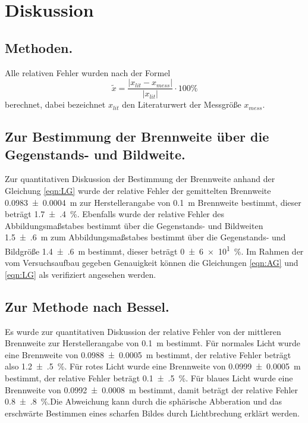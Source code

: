 \section{Diskussion}
\label{sec:Diskussion}
\subsection{Methoden.}
Alle relativen Fehler wurden nach der Formel
\begin{equation*}
  \tilde{x} = \frac{ \lvert x_{lit} - x_{mess} \rvert}{\lvert x_{lit} \rvert}
  \cdot 100 \%
\end{equation*}
berechnet, dabei bezeichnet $x_{lit}$ den Literaturwert der Messgröße $x_{mess}$.

\subsection{Zur Bestimmung der Brennweite über die Gegenstands- und Bildweite.}
Zur quantitativen Diskussion der Bestimmung der Brennweite anhand der Gleichung
\eqref{eqn:LG} wurde der relative Fehler der gemittelten Brennweite
\SI{0.0983(4)}{\meter} zur Herstellerangabe von \SI{0.1}{\meter} Brennweite
bestimmt, dieser beträgt \SI{1.7(4)}{\percent}. Ebenfalls wurde der relative
Fehler des Abbildungsmaßstabes bestimmt über die Gegenstands- und Bildweiten
\SI{1.5(6)}{\meter}
zum Abbildungsmaßstabes bestimmt über die Gegenstands- und Bildgröße
\SI{1.4(6)}{\meter} bestimmt, dieser beträgt \SI{0(6)e1}{\percent}.
Im Rahmen der vom Versuchsaufbau gegeben Genauigkeit können die Gleichungen
\eqref{eqn:AG} und \eqref{eqn:LG} als verifiziert angesehen werden.

\subsection{Zur Methode nach Bessel.}
Es wurde zur quantitativen Diskussion der relative Fehler von
der mittleren Brennweite zur Herstellerangabe von \SI{0.1}{\meter} bestimmt.
Für normales Licht wurde eine Brennweite von \SI{0.0988(5)}{\meter} bestimmt,
der relative Fehler beträgt also \SI{1.2(5)}{\percent}.
Für rotes Licht wurde eine Brennweite von \SI{0.0999(5)}{\meter}
bestimmt, der relative Fehler beträgt \SI{0.1(5)}{\percent}. Für blaues
Licht wurde eine Brennweite von \SI{0.0992(8)}{\meter} bestimmt, damit
beträgt der relative Fehler \SI{0.8(8)}{\percent}.Die Abweichung kann durch die sphärische
Abberation und das erschwärte Bestimmen eines scharfen Bildes durch Lichtbrechung
erklärt werden.

